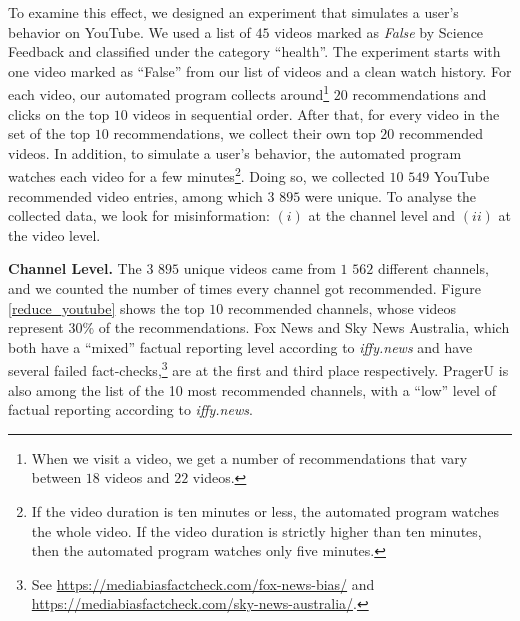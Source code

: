 \documentclass{article}
\begin{document}
To examine this effect, we designed an experiment that simulates a user's behavior on YouTube. 
We used a list of $45$ videos marked as {\it False} by Science Feedback and classified under the category ``health''.
The experiment starts with one video marked as ``False'' from our list of videos and a clean watch history.
For each video, our automated program collects around\footnote{When we visit a video, we get a number of recommendations that vary between $18$ videos and $22$ videos.}
$20$ recommendations and clicks on the top $10$ videos in sequential order. 
After that, for every video in the set of the top $10$ recommendations, we collect their own top $20$ recommended videos.
In addition, to simulate a user's behavior, the automated program watches each video for a few minutes\footnote{If the video duration is ten minutes or less, the automated program watches the whole video. If the video duration is strictly higher than ten minutes, then the automated program watches only five minutes.}.
Doing so, we collected $10$ $549$ YouTube recommended video entries, among which $3$ $895$ were unique. 
To analyse the collected data, we look for misinformation: $(i)$ at the channel level and $(ii)$ at the video level. 

\smallskip

{\bf Channel Level.} 
The $3$ $895$ unique videos came from $1$ $562$ different channels, and we counted the number of times every channel got recommended.
Figure \ref{reduce_youtube} shows the top $10$ recommended channels, whose videos represent $30\%$ of the recommendations.
Fox News and Sky News Australia, which both have a ``mixed'' factual reporting level according to {\it iffy.news} and have several failed fact-checks,\footnote{See \href{https://mediabiasfactcheck.com/fox-news-bias/}{https://mediabiasfactcheck.com/fox-news-bias/} and \href{https://mediabiasfactcheck.com/sky-news-australia/}{https://mediabiasfactcheck.com/sky-news-australia/}.} are at the first and third place respectively.
PragerU is also among the list of the 10 most recommended channels, with a ``low'' level of factual reporting according to {\it iffy.news}.

\smallskip 
\end{document}
